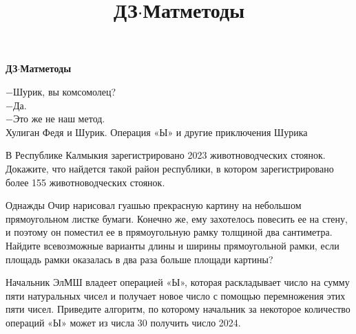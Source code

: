 \centerline{\bf \Huge ДЗ$\cdot$Матметоды}
\title{ДЗ$\cdot$Матметоды}

\begin{flushright}
    \scriptsize $-$Шурик, вы комсомолец?\\$-$Да.\\$-$Это же не наш метод.\\
    Хулиган Федя и Шурик. Операция «Ы» и другие приключения Шурика 
\end{flushright}

\noindent{}В Республике Калмыкия зарегистрировано 2023 животноводческих стоянок. Докажите, что найдется такой район республики, в котором зарегистрировано более 155 животноводческих стоянок.

\noindent{}Однажды Очир нарисовал гуашью прекрасную картину на небольшом прямоугольном листке бумаги. Конечно же, ему захотелось повесить ее на стену, и поэтому он поместил ее в прямоугольную рамку толщиной два сантиметра. Найдите всевозможные варианты длины и ширины прямоугольной рамки, если площадь рамки оказалась в два раза больше площади картины?

\noindent{}Начальник ЭлМШ владеет операцией «Ы», которая раскладывает число на сумму пяти натуральных чисел и получает новое число с помощью перемножения этих пяти чисел. Приведите алгоритм, по которому начальник за некоторое количество операций «Ы» может из числа 30 получить число 2024. 